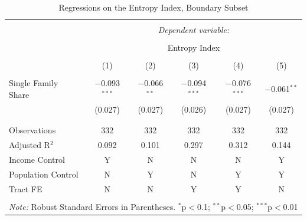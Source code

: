 \documentclass[11pt]{article}
\begin{document}
\begin{table}[!htbp] \centering 

  \caption{Regressions on the Entropy Index, Boundary Subset} 
  \label{tab:Entropy_Causal} 
\begin{tabular}{@{\extracolsep{5pt}}lccccc} 
\\[-1.8ex]\hline 
\hline \\[-1.8ex] 
 & \multicolumn{5}{c}{\textit{Dependent variable:}} \\ 
\cline{2-6} 
\\[-1.8ex] & \multicolumn{5}{c}{Entropy Index} \\ 
\\[-1.8ex] & (1) & (2) & (3) & (4) & (5)\\ 
\hline \\[-1.8ex] 
 Single Family Share & $-$0.093$^{***}$ & $-$0.066$^{**}$ & $-$0.094$^{***}$ & $-$0.076$^{***}$ & $-$0.061$^{**}$ \\ 
  & (0.027) & (0.027) & (0.026) & (0.027) & (0.027) \\ 
  & & & & & \\ 
\hline \\[-1.8ex] 
Observations & 332 & 332 & 332 & 332 & 332 \\ 
Adjusted R$^{2}$ & 0.092 & 0.101 & 0.297 & 0.312 & 0.144 \\ 
\hline
Income Control & Y & N & N & N & Y\\
Population Control & N & Y & N & Y & Y\\
Tract FE & N & N & Y & Y & N\\
\hline 
\hline \\[-1.8ex] 
\multicolumn{6}{l}{\textit{Note:} Robust Standard Errors in Parentheses. $^{*}$p$<$0.1; $^{**}$p$<$0.05; $^{***}$p$<$0.01} \\
\end{tabular} 
\end{table} 
\end{document}
